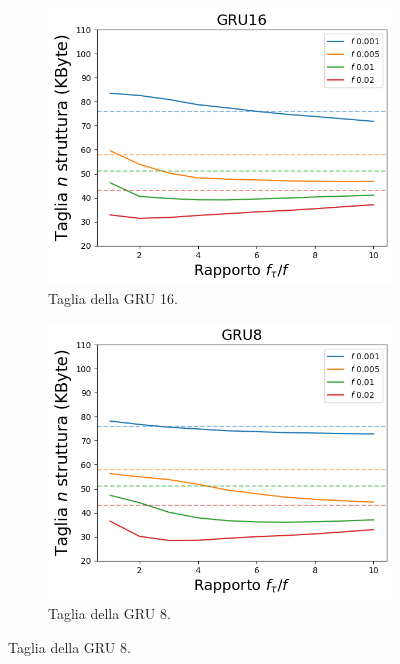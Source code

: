 \documentclass[../../main.tex]{subfiles}
\begin{document}
    \begin{figure}[H]
        \centering
        \begin{subfigure}[b]{0.32\textwidth}
            \centering
            \includegraphics[width = \textwidth]{immagini/7/SLBF/GRU16_Taglia.png}
            \caption{Taglia della GRU 16.}
            \label{fig:SLBFTagliaGRU16}
        \end{subfigure}
        \begin{subfigure}[b]{0.32\textwidth}
            \centering
            \includegraphics[width = \textwidth]{immagini/7/SLBF/GRU8_Taglia.png}
            \caption{Taglia della GRU 8.}

\end{subfigure}
\end{figure}
\end{document}

